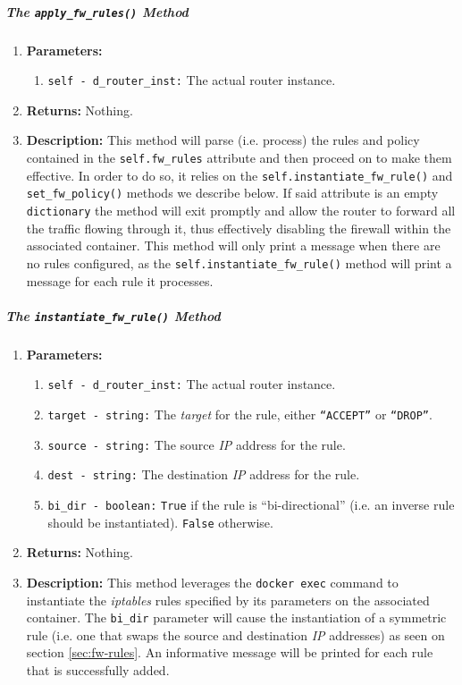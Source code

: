         \subparagraph{The \texttt{apply\_fw\_rules()} Method}
            \begin{enumerate}
                \item \textbf{Parameters:}
                \begin{enumerate}
                    \item \texttt{self - d\_router\_inst:} The actual router instance.
                \end{enumerate}
                \item \textbf{Returns:} Nothing.
                \item \textbf{Description:} This method will parse (i.e. process) the rules and policy contained in the \texttt{self.fw\_rules} attribute and then proceed on to make them effective. In order to do so, it relies on the \texttt{self.instantiate\_fw\_rule()} and \texttt{set\_fw\_policy()} methods we describe below. If said attribute is an empty \texttt{dictionary} the method will exit promptly and allow the router to forward all the traffic flowing through it, thus effectively disabling the firewall within the associated container. This method will only print a message when there are no rules configured, as the \texttt{self.instantiate\_fw\_rule()} method will print a message for each rule it processes.
            \end{enumerate}

        \subparagraph{The \texttt{instantiate\_fw\_rule()} Method}
            \begin{enumerate}
                \item \textbf{Parameters:}
                \begin{enumerate}
                    \item \texttt{self - d\_router\_inst:} The actual router instance.
                    \item \texttt{target - string:} The \textit{target} for the rule, either \texttt{``ACCEPT''} or \texttt{``DROP''}.
                    \item \texttt{source - string:} The source \textit{IP} address for the rule.
                    \item \texttt{dest - string:} The destination \textit{IP} address for the rule.
                    \item \texttt{bi\_dir - boolean:} \texttt{True} if the rule is ``bi-directional'' (i.e. an inverse rule should be instantiated). \texttt{False} otherwise.
                \end{enumerate}
                \item \textbf{Returns:} Nothing.
                \item \textbf{Description:} This method leverages the \texttt{docker exec} command to instantiate the \textit{iptables} rules specified by its parameters on the associated container. The \texttt{bi\_dir} parameter will cause the instantiation of a symmetric rule (i.e. one that swaps the source and destination \textit{IP} addresses) as seen on section \ref{sec:fw-rules}. An informative message will be printed for each rule that is successfully added.
            \end{enumerate}

